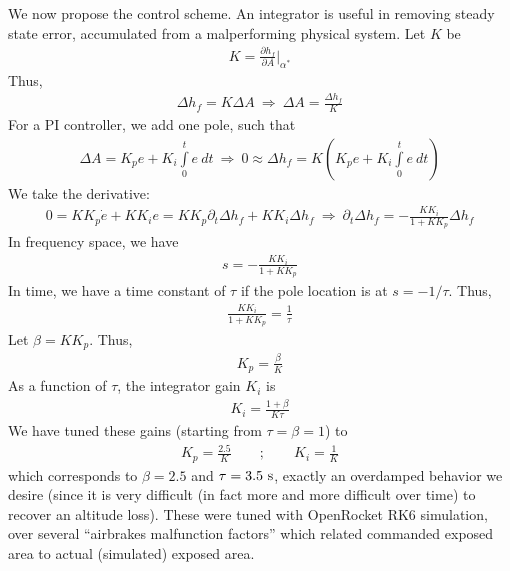 \documentclass{amsdtx}
\begin{document}
We now propose the control scheme. An integrator is useful in removing steady state error, accumulated from a malperforming physical system. Let $K$ be
\begin{align}
	K = \frac{\partial h_f}{\partial A}\biggr|_{\alpha^*}
\end{align}
Thus,
\begin{align}
	\Delta h_f = K\Delta A~\Rightarrow~\Delta A = \frac{\Delta h_f}{K}
\end{align}
For a PI controller, we add one pole, such that
\begin{align}
	\Delta A = K_pe + K_i\int\limits_0^te~dt~\Rightarrow~0\approx \Delta h_f = K\left(K_pe + K_i\int\limits_0^te~dt\right)
\end{align}
We take the derivative:
\begin{align}
	0 = KK_p\dot e + KK_ie = KK_p\partial_t \Delta h_f +KK_i\Delta h_f~\Rightarrow~\partial_t\Delta h_f  = -\frac{KK_i}{1+KK_p}\Delta h_f
\end{align}
In frequency space, we have
\begin{align}
	s = -\frac{KK_i}{1+KK_p}
\end{align}
In time, we have a time constant of $\tau$ if the pole location is at $s=-1/\tau$. Thus, 
\begin{align}
	\frac{KK_i}{1+KK_p} = \frac 1\tau
\end{align}
Let $\beta = KK_p$. Thus,
\begin{align}
	K_p = \frac \beta K
\end{align}
As a function of $\tau$, the integrator gain $K_i$ is
\begin{align}
	K_i = \frac{1+\beta}{K\tau}
\end{align}
We have tuned these gains (starting from $\tau=\beta=1$) to
\begin{align}
	\boxed{K_p = \frac{2.5}{K}}\quad\quad;\quad\quad \boxed{K_i = \frac{1}{K}}
\end{align}
which corresponds to $\beta=2.5$ and $\tau = 3.5\rm~s$, exactly an overdamped behavior we desire (since it is very difficult (in fact more and more difficult over time) to recover an altitude loss). These were tuned with OpenRocket RK6 simulation, over several ``airbrakes malfunction factors'' which related commanded exposed area to actual (simulated) exposed area.
\end{document}
